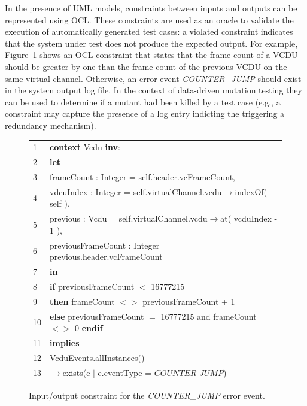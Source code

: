 In the presence of UML models, constraints between inputs and outputs can be represented using OCL.
These constraints are used as an oracle to validate the execution of automatically generated test cases: a violated constraint indicates that the system under test does not produce the expected output. 
For example, Figure~\ref{fig:costraint:firstHeader} shows an OCL constraint that states that the frame count of a VCDU should be greater by one than the frame count of the previous VCDU on the same virtual channel. Otherwise, an error event \emph{COUNTER\_JUMP} should exist in the system output log file. 
In the context of data-driven mutation testing they can be used to determine if a mutant had been killed by a test case (e.g., a constraint may capture the presence of a log entry indicting the triggering a redundancy mechanism).



\begin{figure}[t!]
\scriptsize
\begin{tabular}{p{0.1cm}p{8cm}}
1&\textbf{context} Vcdu \textbf{inv}:\\
2&\textbf{let}\\
3&\hspace{0.3cm}frameCount : Integer = self.header.vcFrameCount, \\
4&\hspace{0.3cm}vdcuIndex : Integer = self.virtualChannel.vcdu$\rightarrow$indexOf( self ), \\
5&\hspace{0.3cm}previous : Vcdu = self.virtualChannel.vcdu$\rightarrow$at( vcduIndex - 1 ),\\
6&\hspace{0.3cm}previousFrameCount : Integer = previous.header.vcFrameCount\\
7&\textbf{in} \\
8&\hspace{0.3cm}\textbf{if} previousFrameCount $<$ 16777215 \\
9&\hspace{0.6cm}\textbf{then} frameCount $<>$ previousFrameCount + 1 \\
10&\hspace{0.3cm}\textbf{else} previousFrameCount $=$ 16777215 and frameCount $<>$ 0 \textbf{endif}\\
11&\textbf{implies} \\
12&\hspace{0.3cm}VcduEvents.allInstances()\\
13&\hspace{1cm}$\rightarrow$exists(e $|$ e.eventType = $COUNTER\_JUMP$) \\
\end{tabular}
\caption{Input/output constraint for the \emph{COUNTER\_JUMP} error event.}
\label{fig:costraint:firstHeader}
\end{figure}



